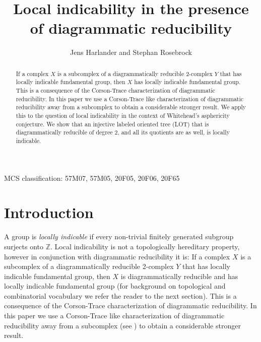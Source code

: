 \documentclass[12pt]{amsart}
\title{Local indicability in the presence of diagrammatic reducibility}
\author{Jens Harlander and Stephan Rosebrock}
\theoremstyle{definition}
\begin{document}
\begin{abstract} If a complex $X$ is a subcomplex of a diagrammatically reducible 2-complex $Y$ that has locally indicable fundamental group, then $X$ has locally indicable fundamental group. This is a consequence of the Corson-Trace characterization of diagrammatic reducibility. In this paper we use a Corson-Trace like characterization of diagrammatic reducibility away from a subcomplex to obtain a considerable stronger result. 
We apply this to the question of local indicability in the context of Whitehead's asphericity conjecture. We show that an injective labeled oriented tree (LOT) that is diagrammatically reducible of degree 2, and all its quotients are as well, is locally indicable. 
\end{abstract}   


\maketitle

\noindent MCS classification: 57M07, 57M05, 20F05, 20F06, 20F65


\section{Introduction}

A group is {\em locally indicable} if every non-trivial finitely generated subgroup surjects onto $\mathbb Z$. Local indicability is not a topologically hereditary property, however in conjunction with diagrammatic reducibility it is: If a complex $X$ is a subcomplex of a diagrammatically reducible 2-complex $Y$ that has locally indicable fundamental group, then $X$ is diagrammatically reducible and has locally indicable fundamental group (for background on topological and combinatorial vocabulary we refer the reader to the next section). This is a consequence of the Corson-Trace characterization of diagrammatic reducibility. In this paper we use a Corson-Trace like characterization of diagrammatic reducibility away from a subcomplex (see \cite{HarRoseDDR}) to obtain a considerable stronger result. 
\end{document}
